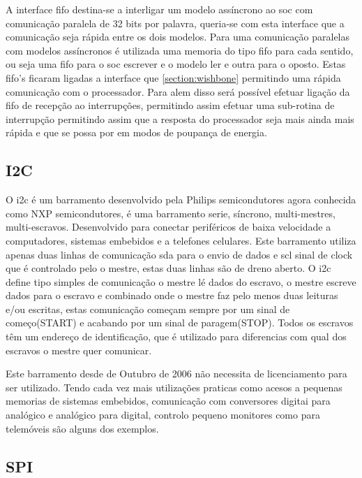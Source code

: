 A interface \acrlong{fifo} destina-se a interligar um modelo assíncrono ao \acrshort{soc} com comunicação paralela de 32 bits por palavra, queria-se com esta interface que a comunicação seja rápida entre os dois modelos. Para uma comunicação paralelas com modelos assíncronos é utilizada uma memoria do tipo \acrshort{fifo} para cada sentido, ou seja uma \acrshort{fifo} para o \acrshort{soc} escrever e o modelo ler e outra para o oposto. Estas \acrshort{fifo}'s ficaram ligadas a interface que \ref{section:wishbone} permitindo uma rápida comunicação com o processador. Para alem disso será possível efetuar ligação da \acrshort{fifo} de recepção ao interrupções, permitindo assim efetuar uma sub-rotina de interrupção permitindo assim que a resposta do processador seja mais ainda mais rápida e que se possa por em modos de poupança de energia.

\subsection{I2C}


O \acrlong{i2c} é um barramento desenvolvido pela Philips semicondutores agora conhecida como NXP semicondutores, é uma barramento serie, síncrono, multi-mestres, multi-escravos. Desenvolvido para conectar periféricos de baixa velocidade a computadores, sistemas embebidos e a telefones celulares. Este barramento utiliza apenas duas linhas de comunicação \acrlong{sda} para o envio de dados e \acrlong{scl} sinal de clock que é controlado pelo o mestre, estas duas linhas são de dreno aberto. O \acrshort{i2c} define tipo simples de comunicação o mestre lé dados do escravo, o mestre escreve dados para o escravo e combinado onde o mestre faz pelo menos duas leituras e/ou escritas, estas comunicação começam sempre por um sinal de começo(START) e acabando por um sinal de paragem(STOP). Todos os escravos têm um endereço de identificação, que é utilizado para diferencias com qual dos escravos o mestre quer comunicar.

Este barramento desde de Outubro de 2006 não necessita de licenciamento para ser utilizado. Tendo cada vez mais utilizações praticas como acesos a pequenas memorias de sistemas embebidos, comunicação com conversores digitai para analógico e analógico para digital, controlo pequeno monitores como para telemóveis são alguns dos exemplos.


\subsection{SPI}
\label{section:spi}

